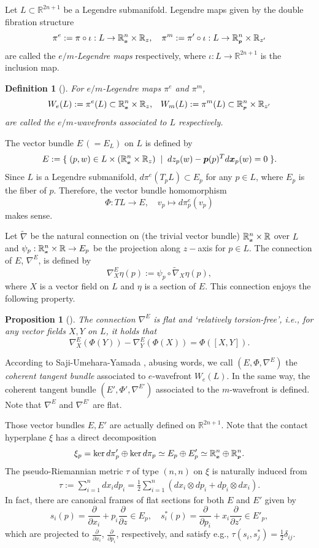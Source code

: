 \documentclass[10pt]{amsart}
\newcommand{\R}{\mathbb{R}}
\def\rd{\partial}
\def\bx{\mbox{\boldmath $x$}}
\def\bp{\mbox{\boldmath $p$}}
\def\bbx{\mbox{\tiny$\bx$}}
\def\bbp{\mbox{\tiny$\bp$}}
\newtheorem{prop}[thm]{\bf Proposition}
\newtheorem{dfn}[thm]{\bf Definition}
\newcommand{\wt}[1]{\widetilde{#1}}
\begin{document}
Let $L\subset \R^{2n+1}$ be a Legendre submanifold. Legendre maps given by the double fibration structure
$$\pi^e:=\pi\circ \iota: L \to \R^n_{\bbx}\times \R_z, \quad \pi^m:=\pi'\circ \iota:  L \to \R^n_{\bbp}\times \R_{z'}$$
are called the {\em $e/m$-Legendre maps} respectively, where $\iota:L\to\R^{2n+1}$ is the inclusion map.

\begin{dfn}[\cite{NT}]\upshape
For $e/m$-Legendre maps $\pi^e$ and $\pi^m$, 
$$W_e(L):=\pi^e(L)\subset \R^n_{\bbx}\times \R_z, \;\;\; 
W_m(L):=\pi^m(L)\subset \R^n_{\bbp}\times \R_{z'}$$
are called the {\em $e/m$-wavefronts associated to $L$} respectively.
\end{dfn}

The vector bundle $E\,(=E_L)$ on $L$ is defined by
$$E := \{\;(p, w) \in L\times (\R^n_{\bbx} \times \R_z)\; \mid \;dz_p(w)-\bp(p)^T d\bx_p(w)=0\; \}.$$
Since $L$ is a Legendre submanifold, $d\pi^e(T_pL)\subset E_p$ for any $p\in L$, where $E_p$ is the fiber of $p$. 
Therefore, the vector bundle homomorphism
$$\Phi : TL \to E, \quad v_p \mapsto d\pi^e_p(v_p)$$
makes sense.

Let $\wt{\nabla}$ be  
the natural connection on (the trivial vector bundle) $\R^n_{\bbx}\times\R$ over $L$
and $\psi_{p} : \R^n_{\bbx} \times\R \to E_{p}$ be the projection along $z-$axis for $p\in L$.
The connection of $E$, $\nabla^E$, is defined by
$$\nabla^E_X\eta (p) := \psi_{p} \circ  \widetilde{\nabla}_X\eta(p),$$
where $X$ is a vector field on $L$ and $\eta$ is a section of $E$. 
This connection enjoys the following property. 

\begin{prop}[\cite{NT}]\upshape
The connection $\nabla^E$ is flat and `relatively torsion-free', i.e.,  
for any vector fields $X, Y$ on $L$, it holds that 
$$\nabla^E_X(\Phi(Y))-\nabla^E_Y(\Phi(X))=\Phi([X, Y]).$$
\end{prop}

According to Saji-Umehara-Yamada \cite{SUY},  abusing words, we call 
$(E, \Phi, \nabla^E)$ the {\em coherent tangent bundle} associated to $e$-wavefront $W_e(L)$.
In the same way, the coherent tangent bundle $(E', \Phi', \nabla^{E'})$ associated to the $m$-wavefront is defined. 
Note that $\nabla^{E}$ and $\nabla^{E'}$ are flat.

Those vector bundles $E, E'$ are actually defined on $\R^{2n+1}$. Note that the contact hyperplane $\xi$ has a direct decomposition 
$$\xi_p= \ker d\pi'_p\oplus\ker d\pi_p \simeq E_p \oplus E'_p \simeq \R^n_{\bbx}\oplus \R^n_{\bbp}.$$
The  
pseudo-Riemannian metric $\tau$ of type $(n, n)$ on $\xi$ is naturally induced from
\begin{align}\label{tau} 
\tau:=\sum_{i=1}^n dx_idp_i=\frac{1}{2}\sum_{i=1}^n (dx_i \otimes dp_i+dp_i \otimes dx_i).
\end{align}
In fact, there are canonical frames of flat sections for both $E$ and $E'$ given by
$$s_i(p) = \frac{\rd}{\rd x_i} + p_i\frac{\rd}{\rd z} \in E_p, \quad s_i^*(p)= \frac{\rd}{\rd p_i}+x_i\frac{\rd}{\rd z'} \in E'_p,$$
which are projected to $\frac{\rd}{\rd x_i}$, $\frac{\rd}{\rd p_i}$, respectively,  
and satisfy e.g., $\tau(s_i, s_j^*)=\frac{1}{2}\delta_{ij}$. 
\end{document}
